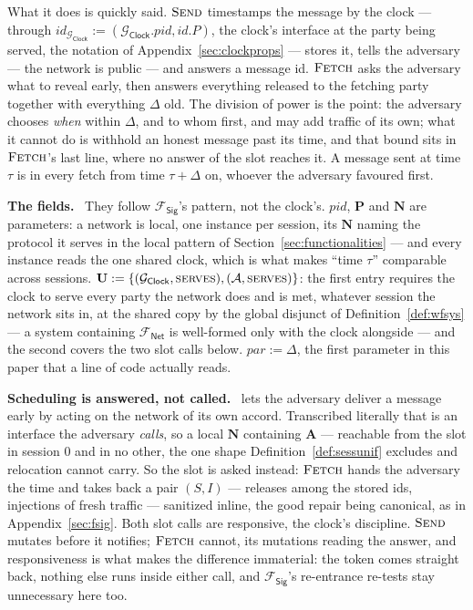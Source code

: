 \documentclass[11pt,a4paper]{article}
\newcommand{\Ps}{\mathbf{P}}
\newcommand{\PID}{\mathit{pid}}
\newcommand{\admits}{\mathbf{N}}
\newcommand{\Apid}{\mathbf{A}}
\newcommand{\pars}{\mathit{par}}
\newcommand{\uses}{\mathbf{U}}
\newcommand{\serves}{\op{serves}}
\newcommand{\Adv}{\mathcal{A}}
\newcommand{\op}[1]{\textsc{#1}}
\newcommand{\id}{id}
\newcommand{\Fsig}{\mathcal{F}_{\mathsf{Sig}}}
\newcommand{\Gclock}{\mathcal{G}_{\mathsf{Clock}}}
\newcommand{\Fnet}{\mathcal{F}_{\mathsf{Net}}}
\newcommand{\heading}[1]{\medskip\par\noindent\textcolor{accent}{\textbf{#1.}}\ }
\theoremstyle{accentdef}
\theoremstyle{accentplain}
\begin{document}
What it does is quickly said. $\op{Send}$ timestamps the message by the clock --- through
$\id_{\Gclock} := (\Gclock.\PID,\id.P)$, the clock's interface at the party being served, the
notation of Appendix~\ref{sec:clockprops} --- stores it, tells the adversary --- the network is
public --- and answers a message id. $\op{Fetch}$ asks the
adversary what to reveal early, then answers everything released to the fetching party together
with everything $\Delta$ old. The division of power is the point: the adversary chooses
\emph{when} within $\Delta$, and to whom first, and may add traffic of its own; what it cannot do
is withhold an honest message past its time, and that bound sits in $\op{Fetch}$'s last line,
where no answer of the slot reaches it. A message sent at time $\tau$ is in every fetch from
time $\tau + \Delta$ on, whoever the adversary favoured first.

\heading{The fields} They follow $\Fsig$'s pattern, not the clock's. $\PID$, $\Ps$ and $\admits$
are parameters: a network is local, one instance per session, its $\admits$ naming the protocol
it serves in the local pattern of Section~\ref{sec:functionalities} --- and every instance reads
the one shared clock, which is what makes ``time $\tau$'' comparable across sessions.
$\uses := \{(\Gclock,\serves),(\Adv,\serves)\}$: the first entry requires the clock to serve
every party the network does and is met, whatever session the network sits in, at the shared copy
by the global disjunct of Definition~\ref{def:wfsys} --- a system containing $\Fnet$ is
well-formed only with the clock alongside --- and the second covers the two slot calls below.
$\pars := \Delta$, the first parameter in this paper that a line of code actually reads.

\heading{Scheduling is answered, not called} \cite{BMTZ17} lets the adversary deliver a message
early by acting on the network of its own accord. Transcribed literally that is an interface the
adversary \emph{calls}, so a local $\admits$ containing $\Apid$ --- reachable from the slot in
session $0$ and in no other, the one shape Definition~\ref{def:sessunif} excludes and relocation
cannot carry. So the slot is asked instead: $\op{Fetch}$ hands the adversary the time and takes
back a pair $(S,I)$ --- releases among the stored ids, injections of fresh traffic --- sanitized
inline, the good repair being canonical, as in Appendix~\ref{sec:fsig}. Both slot calls are
responsive, the clock's discipline. $\op{Send}$ mutates before it notifies; $\op{Fetch}$ cannot,
its mutations reading the answer, and responsiveness is what makes the difference immaterial:
the token comes straight back, nothing else runs inside either call, and $\Fsig$'s re-entrance
re-tests stay unnecessary here too.
\end{document}
